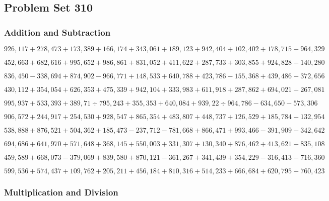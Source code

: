 \hypertarget{problem-set-310}{%
\subsection{Problem Set 310}\label{problem-set-310}}

\hypertarget{addition-and-subtraction}{%
\subsubsection{Addition and
Subtraction}\label{addition-and-subtraction}}

\(926,117+278,473+173,389+166,174+343,061+189,123+942,404+102,402+178,715+964,329\)

\(452,663+682,616+995,652+986,861+831,052+411,622+287,733+303,855+924,828+140,280\)

\(836,450-338,694+874,902-966,771+148,533+640,788+423,786-155,368+439,486-372,656\)

\(430,112+354,054+626,353+475,339+942,104+333,983+611,918+287,862+694,021+267,081\)

\(995,937+533,393+389,71÷795,243+355,353+640,084+939,22÷964,786-634,650-573,306\)

\(906,572+244,917+254,530+928,547+865,354+483,807+448,737+126,529+185,784+132,954\)

\(538,888+876,521+504,362+185,473-237,712-781,668+866,471+993,466-391,909-342,642\)

\(694,686+641,970+571,648+368,145+550,003+331,307+130,340+876,462+413,621+835,108\)

\(459,589+668,073-379,069+839,580+870,121-361,267+341,439+354,229-316,413-716,360\)

\(599,536+574,437+109,762+205,211+456,184+810,316+514,233+666,684+620,795+760,423\)

\hypertarget{multiplication-and-division}{%
\subsubsection{Multiplication and
Division}\label{multiplication-and-division}}


